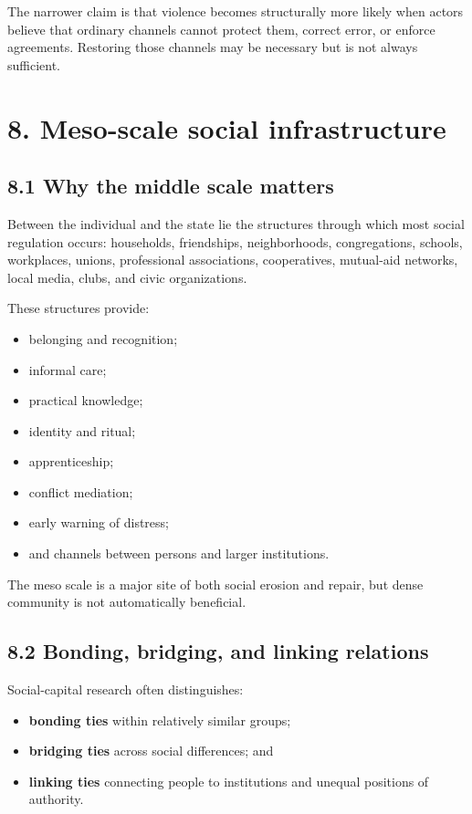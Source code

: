 \documentclass[
  11pt,
]{article}
\providecommand{\tightlist}{%
  \setlength{\itemsep}{0pt}\setlength{\parskip}{0pt}}
\begin{document}
The narrower claim is that violence becomes structurally more likely
when actors believe that ordinary channels cannot protect them, correct
error, or enforce agreements. Restoring those channels may be necessary
but is not always sufficient.

\section{8. Meso-scale social
infrastructure}\label{meso-scale-social-infrastructure}

\subsection{8.1 Why the middle scale
matters}\label{why-the-middle-scale-matters}

Between the individual and the state lie the structures through which
most social regulation occurs: households, friendships, neighborhoods,
congregations, schools, workplaces, unions, professional associations,
cooperatives, mutual-aid networks, local media, clubs, and civic
organizations.

These structures provide:

\begin{itemize}
\tightlist
\item
  belonging and recognition;
\item
  informal care;
\item
  practical knowledge;
\item
  identity and ritual;
\item
  apprenticeship;
\item
  conflict mediation;
\item
  early warning of distress;
\item
  and channels between persons and larger institutions.
\end{itemize}

The meso scale is a major site of both social erosion and repair, but
dense community is not automatically beneficial.

\subsection{8.2 Bonding, bridging, and linking
relations}\label{bonding-bridging-and-linking-relations}

Social-capital research often distinguishes:

\begin{itemize}
\tightlist
\item
  \textbf{bonding ties} within relatively similar groups;
\item
  \textbf{bridging ties} across social differences; and
\item
  \textbf{linking ties} connecting people to institutions and unequal
  positions of authority.
\end{itemize}
\end{document}
